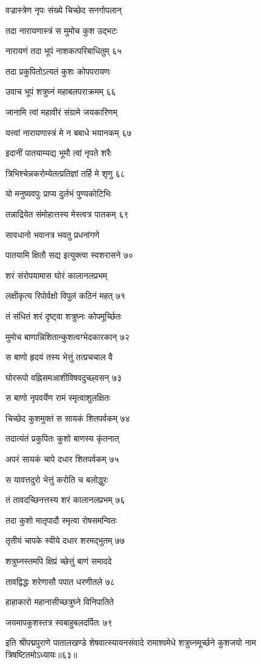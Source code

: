 वज्रास्त्रेण नृपः संख्ये चिच्छेद सनगोपलान्

तदा नारायणास्त्रं स मुमोच कुश उद्भटः

नारायणं तदा भूपं नाशकत्परिबाधितुम् ६५

तदा प्रकुपितोऽत्यतं कुशः कोपपरायणः

उवाच भूपं शत्रुघ्नं महाबलपराक्रमम् ६६

जानामि त्वां महावीरं संग्रामे जयकारिणम्

यत्त्वां नारायणास्त्रं मे न बबाधे भयानकम् ६७

इदानीं पातयाम्यद्य भूमौ त्वां नृपते शरैः

त्रिभिश्चेन्नकरोम्येतत्प्रतिज्ञां तर्हि मे शृणु ६८

यो मनुष्यवपुः प्राप्य दुर्लभं पुण्यकोटिभिः

तन्नाद्रियेत संमोहात्तस्य मेस्त्वत्र पातकम् ६९

सावधानो भवानत्र भवतु प्रधनांगणे

पातयामि क्षितौ सद्य इत्युक्त्वा स्वशरासने ७०

शरं संरोपयामास घोरं कालानलप्रभम्

लक्षीकृत्य रिपोर्वक्षो विपुलं कठिनं महत् ७१

तं संधितं शरं दृष्ट्वा शत्रुघ्नः कोपमूर्च्छितः

मुमोच बाणान्निशितान्कुशत्वग्भेदकारकान् ७२

स बाणो हृदयं तस्य भेत्तुं तत्प्रचचाल वै

घोररूपो वह्निसमआशीविषवदुच्छ्वसन् ७३

स बाणो नृपवर्येण रामं स्मृत्वाशुलक्षितः

चिच्छेद कुशमुक्तं स सायकं शितपर्वकम् ७४

तदात्यंतं प्रकुपितः कुशो बाणस्य कृंतनात्

अपरं सायकं चापे दधार शितपर्वकम् ७५

स यावत्तदुरो भेत्तुं करोति च बलोद्धुरः

तं तावदच्छिनत्तस्य शरं कालानलप्रभम् ७६

तदा कुशो मातृपादौ स्मृत्वा रोषसमन्वितः

तृतीयं चापके स्वीये दधार शरमद्भुतम् ७७

शत्रुघ्नस्तमपि क्षिप्रं च्छेत्तुं बाणं समाददे

तावद्विद्धः शरेणासौ पपात धरणीतले ७८

हाहाकारो महानासीच्छत्रुघ्ने विनिपातिते

जयमापकुशस्तत्र स्वबाहुबलदर्पितः ७९

इति श्रीपद्मपुराणे पातालखण्डे शेषवात्स्यायनसंवादे रामाश्वमेधे शत्रुघ्नमूर्च्छने कुशजयो नाम त्रिषष्टितमोऽध्यायः॥६३॥

